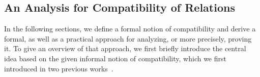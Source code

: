


\subsection{An Analysis for Compatibility of Relations}

In the following sections, we define a formal notion of compatibility and derive a formal, as well as a practical approach for analyzing, or more precisely, proving it.
To give an overview of that approach, we first briefly introduce the central idea based on the given informal notion of compatibility, which we first introduced in two previous works~.

